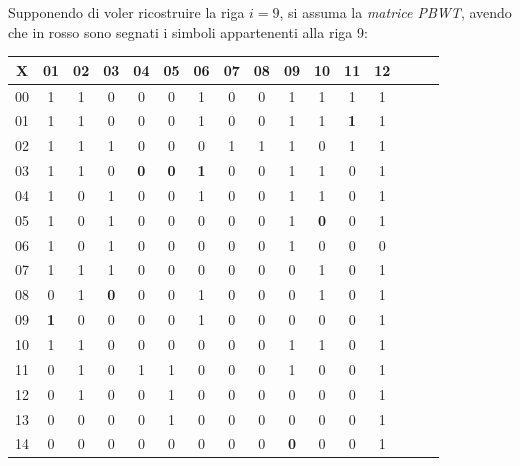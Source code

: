 \begin{esempio}
   Supponendo di voler ricostruire la riga $i=9$, si assuma la \textit{matrice
     PBWT}, avendo che in rosso sono segnati i simboli appartenenti alla riga 9: 
  \begin{table}[H]
    \centering
    \footnotesize
    \begin{tabular}{c|ccccccccccccccc}
      X & 01 & 02 & 03 & 04 & 05 & 06 & 07 & 08 & 09 & 10 & 11 & 12 \\
      \hline
      00 & 1 & 1 & 0 & 0 & 0 & 1 & 0 & 0 & 1 & 1 & 1 & 1 \\
      01 & 1 & 1 & 0 & 0 & 0 & 1 & 0 & 0 & 1 & 1 & {\color{nordred}\textbf{1}}
                                                               & 1 \\
      02 & 1 & 1 & 1 & 0 & 0 & 0 & 1 & 1 & 1 & 0 & 1 & 1 \\
      03 & 1 & 1 & 0 & {\color{nordred}\textbf{0}} & {\color{nordred}\textbf{0}}
                                 & {\color{nordred}\textbf{1}} & 0 & 0 & 1 & 1
                                                          & 0 & 1 \\
      04 & 1 & 0 & 1 & 0 & 0 & 1 & 0 & 0 & 1 & 1 & 0 & 1 \\
      05 & 1 & 0 & 1 & 0 & 0 & 0 & 0 & 0 & 1 & {\color{nordred}\textbf{0}} & 0
                                                               & 1 \\
      06 & 1 & 0 & 1 & 0 & 0 & 0 & 0 & 0 & 1 & 0 & 0 & 0 \\
      07 & 1 & 1 & 1 & 0 & 0 & 0 & 0 & 0 & 0 & 1 & 0 & 1 \\
      08 & 0 & 1 & {\color{nordred}\textbf{0}} & 0 & 0 & 1 & 0 & 0 & 0 & 1 & 0
                                                               & 1 \\
      09 & {\color{nordred}\textbf{1}} & 0 & 0 & 0 & 0 & 1 & 0 & 0 & 0 & 0 & 0
                                                               & 1 \\
      10 & 1 & 1 & 0 & 0 & 0 & 0 & 0 & 0 & 1 & 1 & 0 & 1 \\
      11 & 0 & 1 & 0 & 1 & 1 & 0 & 0 & 0 & 1 & 0 & 0 & 1 \\
      12 & 0 & 1 & 0 & 0 & 1 & 0 & 0 & 0 & 0 & 0 & 0 & 1 \\
      13 & 0 & 0 & 0 & 0 & 1 & 0 & 0 & 0 & 0 & 0 & 0 & 1 \\
      14 & 0 & 0 & 0 & 0 & 0 & 0 & 0 & 0 & {\color{nordred}\textbf{0}} & 0 & 0
                                                               & 1 \\

\end{tabular}
\end{table}
\end{esempio}
